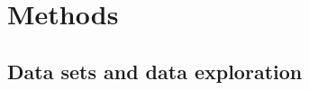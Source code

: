 %
%
%
%
%
%
%
%
%

\section*{Methods}\label{sec:methods}

\subsection*{Data sets and data exploration}

